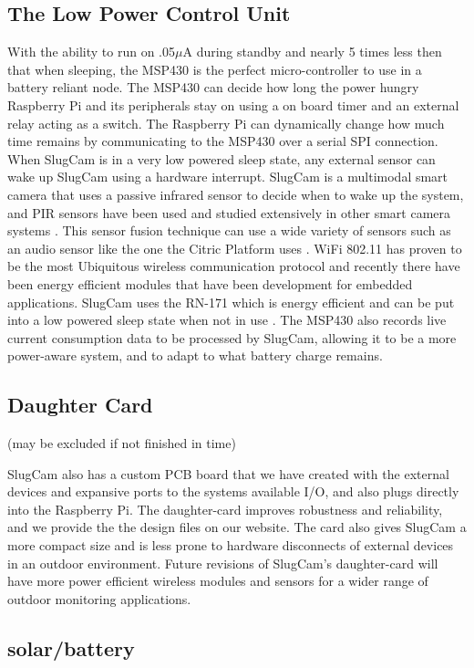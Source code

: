 \documentclass[10pt,conference]{IEEEtran}
\begin{document}
\subsection{ The Low Power Control Unit}
With the ability to run on .05$\mu$A during standby and nearly 5 times less then that when sleeping, the MSP430 is the perfect micro-controller to use in a battery reliant node. The MSP430 can decide how long the power hungry Raspberry Pi and its peripherals stay on using a on board timer and an external relay acting as a switch. The Raspberry Pi can dynamically change how much time remains by communicating to the MSP430 over a serial SPI connection.  When SlugCam is in a very low powered sleep state, any external sensor can wake up SlugCam using a hardware interrupt. SlugCam is a multimodal smart camera that uses a passive infrared sensor to decide when to wake up the system, and PIR sensors have been used and studied extensively in other smart camera systems \cite{solarpirvideo}. This sensor fusion technique can use a wide variety of sensors such as an audio sensor like the one the Citric Platform uses \cite{Citric}. WiFi 802.11 has proven to be the most Ubiquitous wireless communication protocol and recently there have been energy efficient modules that have been development for embedded applications. SlugCam uses the RN-171 which is energy efficient and can be put into a low powered sleep state when not in use \cite{wifi}. The MSP430 also records live current consumption data to be processed by SlugCam, allowing it to be a more power-aware system, and to adapt to what battery charge remains.

\subsection{Daughter Card} (may be excluded if not finished in time)

SlugCam also has a custom PCB board that we have created with the external devices and expansive ports to the systems available I/O, and also plugs directly into the Raspberry Pi. The daughter-card improves robustness and reliability, and we provide the the design files on our website. The card also gives SlugCam a more compact size and is less prone to hardware disconnects of external devices in an outdoor environment. Future revisions of SlugCam's daughter-card will have more power efficient wireless modules and sensors for a wider range of outdoor monitoring applications.

\subsection{solar/battery}
\end{document}
